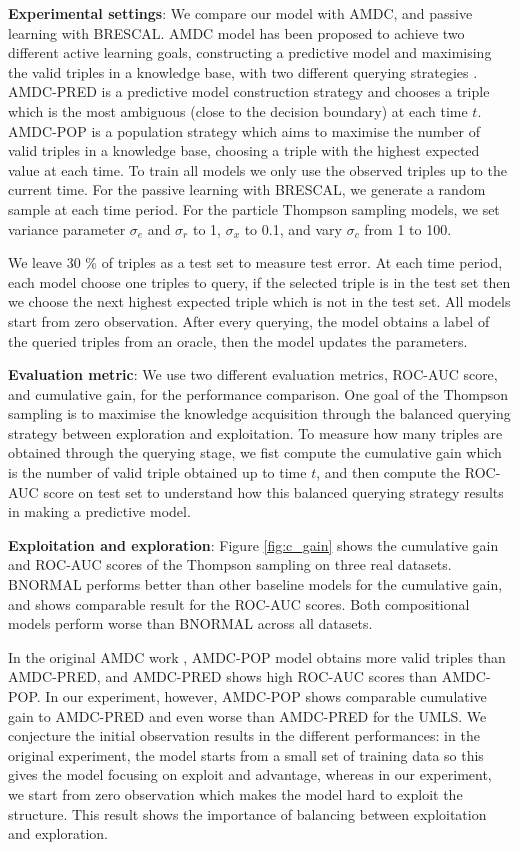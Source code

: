 \textbf{Experimental settings}: 
We compare our model with AMDC, and passive learning with BRESCAL.  
AMDC model has been proposed to achieve two different active learning goals, constructing a predictive
model and maximising the valid triples in a knowledge base, with two different querying strategies
 \cite{kajino2015active}. 
AMDC-PRED is a predictive model construction strategy and chooses a triple which is the most ambiguous (close to the decision boundary) at each time $t$.
AMDC-POP is a population strategy which aims to maximise the number of valid triples in a knowledge base, choosing a triple with the highest expected value at each time.  
To train all models we only use the observed triples up to the current time. For the passive learning with BRESCAL, we generate a random sample at each time period. For the particle Thompson sampling models, we set variance parameter $\sigma_e$ and $\sigma_r$ to 1, $\sigma_x$ to 0.1, and vary $\sigma_c$ from 1 to 100.

We leave 30 \% of triples as a test set to measure test error. 
At each time period, each model choose one triples to query, 
if the selected triple is in the test set then we choose the next highest expected triple which is not in the test set.
All models start from zero observation. 
After every querying, the model obtains a label of the queried triples from an oracle,
then the model updates the parameters. 

\textbf{Evaluation metric}: We use two different evaluation metrics, ROC-AUC score, and cumulative gain,
for the performance comparison. One goal of the Thompson sampling is to maximise the knowledge 
acquisition through the balanced querying strategy between exploration and exploitation. 
To measure how many triples are obtained through the querying stage, we fist compute the cumulative 
gain which is the number of valid triple obtained up to time $t$, and then compute the ROC-AUC score on 
test set to understand how this balanced querying strategy results in making a predictive model.

\textbf{Exploitation and exploration}: 
Figure \ref{fig:c_gain} shows 
the cumulative gain and ROC-AUC scores of the Thompson sampling on three real datasets.
BNORMAL performs better than other baseline models for the cumulative gain, and shows comparable result for the ROC-AUC scores. Both compositional models perform worse than BNORMAL across all datasets.

In the original AMDC work \cite{kajino2015active}, AMDC-POP model obtains more 
valid triples than AMDC-PRED, and AMDC-PRED shows high ROC-AUC scores than AMDC-POP. 
In our experiment, however, AMDC-POP shows comparable cumulative gain to AMDC-PRED 
and even worse than AMDC-PRED for the UMLS. We conjecture the initial observation 
results in the  different performances: in the original experiment, the model starts
from a small set of training data so this gives the model focusing on exploit and advantage, 
whereas in our experiment, we start from zero 
observation which makes the model hard to exploit the structure. This result shows 
the importance of balancing between exploitation and exploration.


